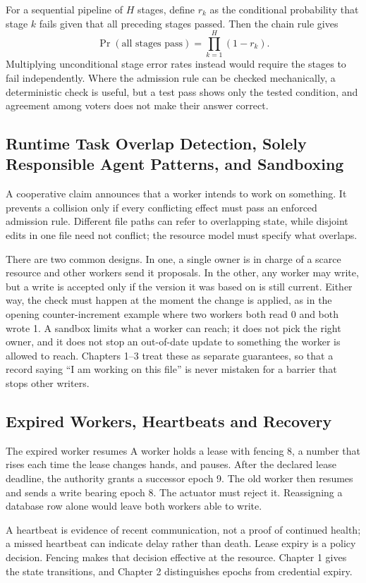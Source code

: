 For a sequential pipeline of $H$ stages, define $r_k$ as the conditional probability that stage $k$ fails given that all preceding stages passed. Then the chain rule gives
\begin{equation}
\Pr(\text{all stages pass})=\prod_{k=1}^{H}(1-r_k).
\end{equation}
Multiplying unconditional stage error rates instead would require the stages to fail independently. Where the admission rule can be checked mechanically, a deterministic check is useful, but a test pass shows only the tested condition, and agreement among voters does not make their answer correct.

\subsection{Runtime Task Overlap Detection, Solely Responsible Agent Patterns, and Sandboxing}

A cooperative claim announces that a worker intends to work on
something. It prevents a collision only if every
conflicting effect must pass an enforced admission rule. Different file
paths can refer to overlapping state, while disjoint edits in one file need
not conflict; the resource model must specify what overlaps.

There are two common designs. In one, a single owner is in charge of a scarce
resource and other workers send it proposals. In the other, any worker may
write, but a write is accepted only if the version it was based on is still
current. Either way, the check must happen at the moment the change is
applied, as in the opening counter-increment example where two workers both read 0 and
both wrote 1. A sandbox limits what a worker can reach; it does not pick the
right owner, and it does not stop an out-of-date update to something the
worker is allowed to reach. Chapters 1--3 treat these as separate guarantees,
so that a record saying ``I am working on this file'' is never mistaken for a
barrier that stops other writers.

\subsection{Expired Workers, Heartbeats and Recovery}

\begin{pdexample}{The expired worker resumes}
A worker holds a lease with fencing  8, a number that rises each
time the lease changes hands, and pauses. After the declared lease deadline,
the authority grants a successor epoch 9. The old worker then resumes and sends
a write bearing epoch 8. The actuator must reject it. Reassigning a database
row alone would leave both workers able to write.
\end{pdexample}
A heartbeat is evidence of recent communication, not a proof of continued
health; a missed heartbeat can indicate delay rather than death. Lease expiry
is a policy decision. Fencing makes that decision effective at the resource.
Chapter 1 gives the state transitions, and Chapter 2 distinguishes epochs
from credential expiry.

